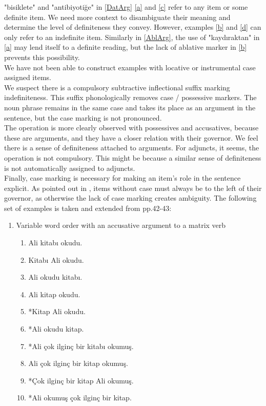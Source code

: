 \documentclass[11pt]{article} %
\begin{document}
"bisiklete" and "antibiyotiğe" in \ref{DatArg} \ref{a} and \ref{c} refer to any item or some definite item. We need more context to disambiguate their meaning and determine the level of definiteness they convey. However, examples \ref{b} and \ref{d} can only refer to an indefinite item. Similarly in \ref{AblArg}, the use of "kaydıraktan" in \ref{a} may lend itself to a definite reading, but the lack of ablative marker in \ref{b} prevents this possibility. \\

We have not been able to construct examples with locative or instrumental case assigned items. \\

We suspect there is a compulsory subtractive inflectional suffix marking indefiniteness. This suffix phonologically removes case / possessive markers. The noun phrase remains in the same case and takes its place as an argument in the sentence, but the case marking is not pronounced. \\

The operation is more clearly observed with possessives and accusatives, because these are arguments, and they have a closer relation with their governor. We feel there is a sense of definiteness attached to arguments. For adjuncts, it seems, the operation is not compulsory. This might be because a similar sense of definiteness is not automatically assigned to adjuncts. \\

Finally, case marking is necessary for making an item's role in the sentence explicit. As pointed out in \citet{Sezer1991}, items without case must always be to the left of their governor, as otherwise the lack of case marking creates ambiguity. The following set of examples is taken and extended from \citet{Sezer1991} pp.42-43:

\begin{enumerate}[resume*] 
	\item Variable word order with an accusative argument to a matrix verb \label{AccArgSezer}
	\begin{enumerate}[label=(\alph*), ref=(\alph*)]\itemsep1pt
	\item Ali kitabı okudu. \label{a}
	\item Kitabı Ali okudu. \label{b}
	\item Ali okudu kitabı. \label{c}
	\item Ali kitap okudu. \label{d}
	\item *Kitap Ali okudu. \label{e}
	\item *Ali okudu kitap. \label{f}
	\item *Ali çok ilginç bir kitabı okumuş. \label{g}
	\item Ali çok ilginç bir kitap okumuş. \label{h}
	\item *Çok ilginç bir kitap Ali okumuş. \label{i}
	\item *Ali okumuş çok ilginç bir kitap. \label{j}
	\end{enumerate}
\end{enumerate}
\end{document}
